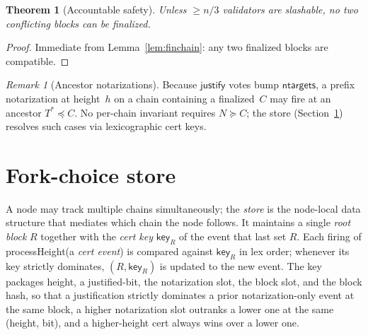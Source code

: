 \ifx\litemode\undefined\documentclass{article}\fi
\newcommand{\just}{\ensuremath{\mathsf{justify}}\xspace}
\newcommand{\ntargets}{\mathsf{ntargets}}
\newcommand{\key}{\mathsf{key}}
\newcommand{\processHeight}{\textsf{processHeight}\xspace}
\theoremstyle{plain}
\newtheorem{theorem}{Theorem}
\theoremstyle{definition}
\theoremstyle{remark}
\newtheorem{remark}{Remark}
\begin{document}
\begin{theorem}[Accountable safety]\label{thm:safety}
Unless $\geq n/3$ validators are slashable, no two conflicting blocks can be finalized.
\end{theorem}

\begin{proof}
Immediate from Lemma~\ref{lem:finchain}: any two finalized blocks are compatible.
\end{proof}

\begin{remark}[Ancestor notarizations]\label{rem:notarization-safety}
Because \just votes bump $\ntargets$, a prefix notarization at height~$h$ on a chain containing a finalized~$C$ may fire at an ancestor $T^* \preceq C$.
No per-chain invariant requires $N \succeq C$; the store (Section~\ref{sec:store}) resolves such cases via lexicographic cert keys.
\end{remark}

\section{Fork-choice store}\label{sec:store}

A node may track multiple chains simultaneously; the \emph{store} is the node-local data structure that mediates which chain the node follows.
It maintains a single \emph{root block} $R$ together with the \emph{cert key} $\key_R$ of the event that last set $R$.
Each firing of \processHeight (a \emph{cert event}) is compared against $\key_R$ in lex order; whenever its key strictly dominates, $(R, \key_R)$ is updated to the new event.
The key packages height, a justified-bit, the notarization slot, the block slot, and the block hash, so that a justification strictly dominates a prior notarization-only event at the same block, a higher notarization slot outranks a lower one at the same (height, bit), and a higher-height cert always wins over a lower one.
\end{document}
